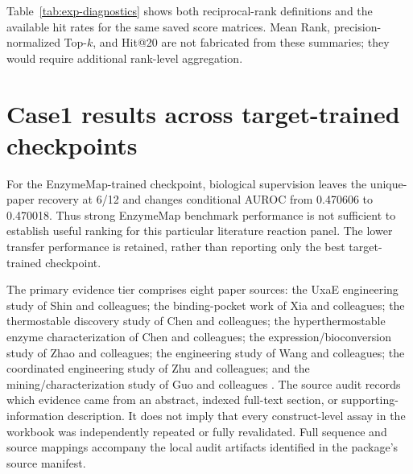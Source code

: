 Table~\ref{tab:exp-diagnostics} shows both reciprocal-rank definitions and
the available hit rates for the same saved score matrices. Mean Rank,
precision-normalized Top-$k$, and Hit@20 are not fabricated from these
summaries; they would require additional rank-level aggregation.

\begin{landscape}
\begin{table}[p]
\centering\small
\caption{Diagnostic ReactZyme metrics from the saved primary test summaries.
``MRR'' is the all-positive metric; ``First MRR'' uses only the earliest
positive. Values are fractions. No checkpoint is reselected using this table.}
\label{tab:exp-diagnostics}
\resizebox{\linewidth}{!}{}
\end{table}
\end{landscape}

\section{Case1 results across target-trained checkpoints}
\label{app:exp-case-targets}

\begin{table}[htbp]
\centering\small
\caption{Case1 transfer diagnostics for every target-trained model. Unique
and entry counts are primary-paper recovery at rank 25, out of 12 and 15
respectively. AUROC is conditional on 81 workbook-active and 42 non-detect-only
unique sequences. Reaction-Sim is the primary deployment; the other rows
do not replace it after examining outcomes.}
\label{tab:exp-case-targets}
\resizebox{\linewidth}{!}{}
\end{table}

For the EnzymeMap-trained checkpoint, biological supervision leaves the
unique-paper recovery at 6/12 and changes conditional AUROC from 0.470606
to 0.470018. Thus strong EnzymeMap benchmark performance is not sufficient
to establish useful ranking for this particular literature reaction panel.
The lower transfer performance is retained, rather than reporting only the
best target-trained checkpoint.

The primary evidence tier comprises eight paper sources: the UxaE
engineering study of Shin and colleagues; the binding-pocket work of Xia
and colleagues; the thermostable discovery study of Chen and colleagues;
the hyperthermostable enzyme characterization of Chen and colleagues; the
expression/bioconversion study of Zhao and colleagues; the engineering study
of Wang and colleagues; the coordinated engineering study of Zhu and colleagues;
and the mining/characterization study of Guo and colleagues
\citep{caseS01,caseS02,caseS03,caseS04,caseS05,caseS06,caseS16,caseS17}.
The source audit records which evidence came from an abstract, indexed
full-text section, or supporting-information description. It does not imply
that every construct-level assay in the workbook was independently repeated
or fully revalidated. Full sequence and source mappings accompany the local
audit artifacts identified in the package's source manifest.
\FloatBarrier

